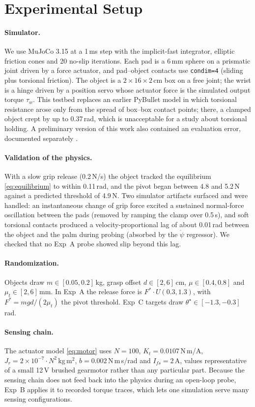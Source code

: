 \documentclass[11pt]{article}
\begin{document}
\section{Experimental Setup}
\paragraph{Simulator.} We use MuJoCo 3.15 \cite{todorov2012} at a 1\,ms step with the implicit-fast integrator, elliptic friction cones and 20 no-slip iterations. Each pad is a 6\,mm sphere on a prismatic joint driven by a force actuator, and pad--object contacts use \texttt{condim=4} (sliding plus torsional friction). The object is a $2\times16\times2$\,cm box on a free joint; the wrist is a hinge driven by a position servo whose actuator force is the simulated output torque $\tau_w$. This testbed replaces an earlier PyBullet model in which torsional resistance arose only from the spread of box--box contact points; there, a clamped object crept by up to 0.37\,rad, which is unacceptable for a study about torsional holding. A preliminary version of this work also contained an evaluation error, documented separately \cite{aidoo2026}.

\paragraph{Validation of the physics.} With a slow grip release (0.2\,N/s) the object tracked the equilibrium \eqref{eq:equilibrium} to within 0.11\,rad, and the pivot began between 4.8 and 5.2\,N against a predicted threshold of 4.9\,N. Two simulator artifacts surfaced and were handled: an instantaneous change of grip force excited a sustained normal-force oscillation between the pads (removed by ramping the clamp over 0.5\,s), and soft torsional contacts produced a velocity-proportional lag of about 0.01\,rad between the object and the palm during probing (absorbed by the $\dot\psi$ regressor). We checked that no Exp~A probe showed slip beyond this lag.

\paragraph{Randomization.} Objects draw $m\in[0.05,0.2]$\,kg, grasp offset $d\in[2,6]$\,cm, $\mu\in[0.4,0.8]$ and $\mu_t\in[2,6]$\,mm. In Exp~A the release force is $F^\ast\cdot U(0.3,1.3)$, with $F^\ast = mgd/(2\mu_t)$ the pivot threshold. Exp~C targets draw $\theta^\star\in[-1.3,-0.3]$\,rad.

\paragraph{Sensing chain.} The actuator model \eqref{eq:motor} uses $N=100$, $K_t = 0.0107$\,N\,m/A, $J_r = 2\times10^{-7}\cdot N^2$\,kg\,m$^2$, $b = 0.002$\,N\,m\,s/rad and $I_{fs}=2$\,A, values representative of a small 12\,V brushed gearmotor rather than any particular part. Because the sensing chain does not feed back into the physics during an open-loop probe, Exp~B applies it to recorded torque traces, which lets one simulation serve many sensing configurations.
\end{document}
